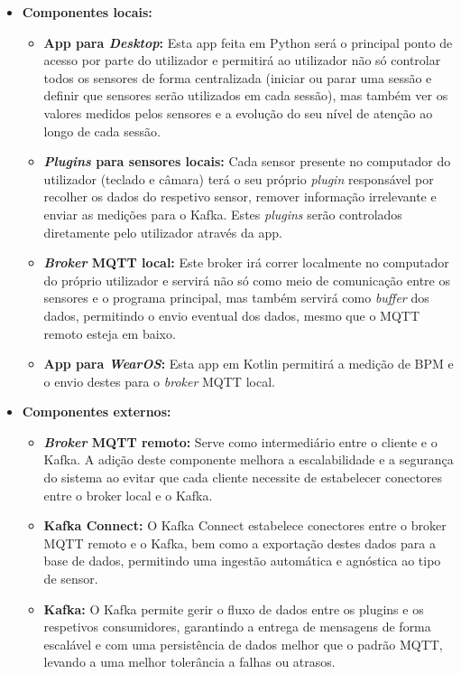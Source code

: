 \begin{itemize}
    \item \textbf{Componentes locais:}
    \begin{itemize}
        \item \textbf{App para \textit{Desktop}:} Esta app feita em Python será o principal ponto de acesso por parte do utilizador e permitirá ao utilizador não só controlar todos os sensores de forma centralizada (iniciar ou parar uma sessão e definir que sensores serão utilizados em cada sessão), mas também ver os valores medidos pelos sensores e a evolução do seu nível de atenção ao longo de cada sessão.
        \item \textbf{\textit{Plugins} para sensores locais:} Cada sensor presente no computador do utilizador (teclado e câmara) terá o seu próprio \textit{plugin} responsável por recolher os dados do respetivo sensor, remover informação irrelevante e enviar as medições para o Kafka. Estes \textit{plugins} serão controlados diretamente pelo utilizador através da app.
        \item \textbf{\textit{Broker} MQTT local:} Este broker irá correr localmente no computador do próprio utilizador e servirá não só como meio de comunicação entre os sensores e o programa principal, mas também servirá como \textit{buffer} dos dados, permitindo o envio eventual dos dados, mesmo que o \ac{MQTT} remoto esteja em baixo.
        \item \textbf{App para \textit{WearOS}:} Esta app em Kotlin permitirá a medição de \ac{BPM} e o envio destes para o \textit{broker} \ac{MQTT} local.
    \end{itemize}
    \item \textbf{Componentes externos:}
    \begin{itemize}
        \item \textbf{\textit{Broker} MQTT remoto:} Serve como intermediário entre o cliente e o Kafka. A adição deste componente melhora a escalabilidade e a segurança do sistema ao evitar que cada cliente necessite de estabelecer conectores entre o broker local e o Kafka.
        \item \textbf{Kafka Connect:} O Kafka Connect estabelece conectores entre o broker \ac{MQTT} remoto e o Kafka, bem como a exportação destes dados para  a base de dados, permitindo uma ingestão automática e agnóstica ao tipo de sensor.
        \item \textbf{Kafka:} O Kafka permite gerir o fluxo de dados entre os plugins e os respetivos consumidores, garantindo a entrega de mensagens de forma escalável e com uma persistência de dados melhor que o padrão \ac{MQTT}, levando a uma melhor tolerância a falhas ou atrasos.

\end{itemize}
\end{itemize}
